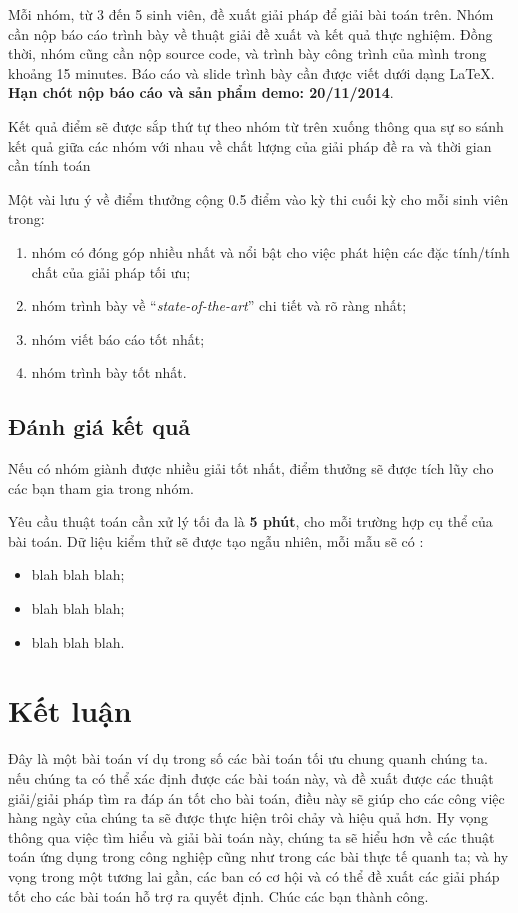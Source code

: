 \documentclass[11pt]{article}
\begin{document}
Mỗi nhóm, từ 3 đến 5 sinh viên, đề xuất giải pháp để giải bài toán trên. 
Nhóm cần nộp báo cáo trình bày về thuật giải đề xuất và kết quả thực nghiệm. Đồng thời, nhóm cũng cần nộp source code, và trình bày công trình của mình trong khoảng 15 minutes.
Báo cáo và slide trình bày cần được viết dưới dạng LaTeX.  
\textbf{Hạn chót nộp báo cáo và sản phẩm demo: 20/11/2014}.

Kết quả điểm sẽ được sắp thứ tự theo nhóm từ trên xuống thông qua sự so sánh kết quả giữa các nhóm với nhau về chất lượng của giải pháp đề ra và thời gian cần tính toán

Một vài lưu ý về điểm thưởng cộng 0.5 điểm vào kỳ thi cuối kỳ cho mỗi sinh viên trong:
\begin{enumerate}
	 \item nhóm có đóng góp nhiều nhất và nổi bật cho việc phát hiện các đặc tính/tính chất của giải pháp tối ưu;
		\item nhóm trình bày về ``\textit{state-of-the-art}'' chi tiết và rõ ràng nhất;
		\item nhóm viết báo cáo tốt nhất;
		\item nhóm trình bày tốt nhất.
\end{enumerate}

\subsection{\texorpdfstring{Đánh giá kết quả}{Evaluation}}\label{eval}

Nếu có nhóm giành được nhiều giải tốt nhất, điểm thưởng sẽ được tích lũy cho các bạn tham gia trong nhóm.

Yêu cầu thuật toán cần xử lý tối đa là \textbf{5 phút}, cho mỗi trường hợp cụ thể của bài toán.
Dữ liệu kiểm thử sẽ được tạo ngẫu nhiên, mỗi mẫu sẽ có :

\begin{itemize}
	\item blah blah blah;
	\item blah blah blah;
	\item blah blah blah.
\end{itemize}


\section{\texorpdfstring{Kết luận}{Conclusion}}\label{conclusion}

Đây là một bài toán ví dụ trong số các bài toán tối ưu chung quanh chúng ta.
nếu chúng ta có thể xác định được các bài toán này, và đề xuất được các thuật giải/giải pháp tìm ra đáp án tốt cho bài toán, điều này sẽ giúp cho các công việc hàng ngày của chúng ta sẽ được thực hiện trôi chảy và hiệu quả hơn.
Hy vọng thông qua việc tìm hiểu và giải bài toán này, chúng ta sẽ hiểu hơn về các thuật toán ứng dụng trong công nghiệp cũng như trong các bài thực tế quanh ta; và hy vọng trong một tương lai gần, các ban có cơ hội và có thể đề xuất các giải pháp tốt cho các bài toán hỗ trợ ra quyết định. 
Chúc các bạn thành công.


\end{document}
